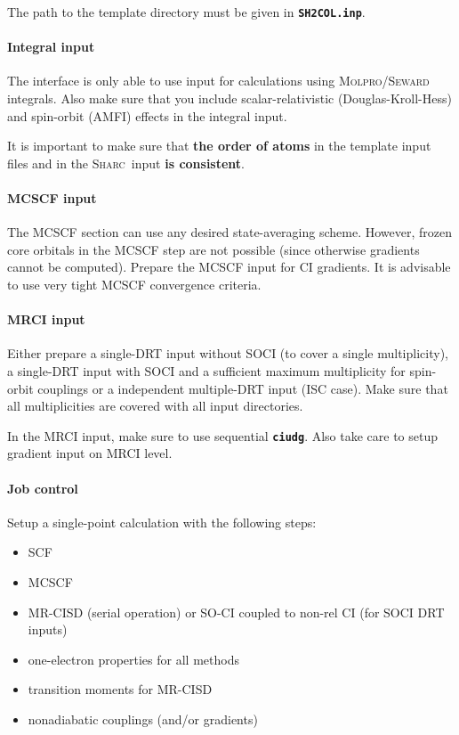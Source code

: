 \documentclass[a4paper,11pt,DIV=15,openany,twoside=false]{scrbook}
\newcommand{\sharc}{\textsc{Sharc}}
\newcommand{\ttt}[1]{\textbf{\texttt{#1}}}
\begin{document}
The path to the template directory must be given in \ttt{SH2COL.inp}.

\paragraph{Integral input}

The interface is only able to use input for calculations using \textsc{Molpro/Seward} integrals. Also make sure that you include scalar-relativistic (Douglas-Kroll-Hess) and spin-orbit (AMFI) effects in the integral input.

It is important to make sure that \textbf{the order of atoms} in the template input files and in the \sharc\ input \textbf{is consistent}.

\paragraph{MCSCF input}

The MCSCF section can use any desired state-averaging scheme. However, frozen core orbitals in the MCSCF step are not possible (since otherwise gradients cannot be computed). Prepare the MCSCF input for CI gradients. It is advisable to use very tight MCSCF convergence criteria.

\paragraph{MRCI input}

Either prepare a single-DRT input without SOCI (to cover a single multiplicity), a single-DRT input with SOCI and a sufficient maximum multiplicity for spin-orbit couplings or a independent multiple-DRT input (ISC case). Make sure that all multiplicities are covered with all input directories.

In the MRCI input, make sure to use sequential \ttt{ciudg}. Also take care to setup gradient input on MRCI level.

\paragraph{Job control}

Setup a single-point calculation with the following steps:
\begin{itemize}
  \item SCF
  \item MCSCF
  \item MR-CISD (serial operation) or SO-CI coupled to non-rel CI (for SOCI DRT inputs)
  \item one-electron properties for all methods
  \item transition moments for MR-CISD
  \item nonadiabatic couplings (and/or gradients)
\end{itemize}
\end{document}
